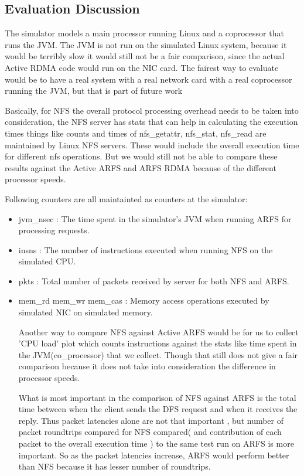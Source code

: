 \documentclass[10pt]{article}
\begin{document}
\begin{itemize}
\section{Evaluation Discussion}
The simulator models a main processor running Linux and a coprocessor that
runs the JVM. The JVM is not run on the simulated Linux system, because
it would be terribly slow it would still not be a fair comparison, since
the actual Active RDMA code would run on the NIC card. The fairest
way to evaluate would be to have a real system with a real network card
with a real coprocessor running the JVM, but that is part of future work


Basically, for NFS the overall protocol processing overhead needs to be
taken into consideration, the NFS server has stats that can help
in calculating the execution times things like counts and times of
nfs_getattr, nfs_stat, nfs_read are maintained by Linux NFS servers. These
would include the overall execution time for different nfs operations. But 
we would still not be able to compare these results against the Active ARFS
and ARFS RDMA because of the different processor speeds.

Following counters are all maintainted as counters at the simulator:
\begin{itemize}
\item jvm_nsec : The time spent in the simulator's JVM when running ARFS for processing requests.
\item  insns : The number of instructions executed when running NFS on the simulated CPU.
\item pkts : Total number of packets received by server for both NFS and ARFS.
\item mem_rd mem_wr mem_cas : Memory access operations executed by simulated NIC on simulated memory.

Another way to compare NFS against Active ARFS would be for us to collect
'CPU load' plot which counts instructions against the stats like
time spent in the JVM(co_processor) that we collect. Though that still
does not give a fair comparison because it does not take into consideration
the difference in processor speeds.

What is most important in the comparison of NFS against ARFS is the total
time between when the client sends the DFS request and when it receives the
reply. Thus packet latencies alone are not that important , but number of packet
roundtrips compared for NFS compared( and contribution of each packet to the
overall execution time ) to the same test run on ARFS is more important. So
as the packet latencies increase, ARFS would perform better than NFS because
it has lesser number of roundtrips.


\end{itemize}
\end{itemize}
\end{document}
